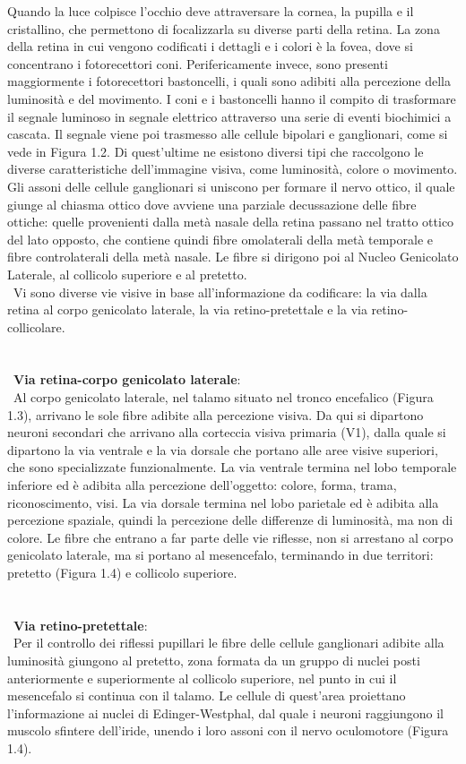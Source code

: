 Quando la luce colpisce l’occhio deve attraversare la cornea, la pupilla e il cristallino, che permettono di focalizzarla su diverse parti della retina. La zona della retina in cui vengono codificati i dettagli e i colori è la fovea, dove si concentrano i fotorecettori coni. Perifericamente invece, sono presenti maggiormente i fotorecettori bastoncelli, i quali sono adibiti alla percezione della luminosità e del movimento. I coni e i bastoncelli hanno il compito di trasformare il segnale luminoso in segnale elettrico attraverso una serie di eventi biochimici a cascata. Il segnale viene poi trasmesso alle cellule bipolari e ganglionari, come si vede in Figura 1.2. Di quest'ultime ne esistono diversi tipi che raccolgono le diverse caratteristiche dell’immagine visiva, come luminosità, colore o movimento. Gli assoni delle cellule ganglionari si uniscono per formare il nervo ottico, il quale giunge al chiasma ottico dove avviene una parziale decussazione delle fibre ottiche: quelle provenienti dalla metà nasale della retina passano nel tratto ottico del lato opposto, che contiene quindi fibre omolaterali della metà temporale e fibre controlaterali della metà nasale. Le fibre si dirigono poi al Nucleo Genicolato Laterale, al collicolo superiore e al pretetto\cite{bib17}. 
\\\
Vi sono diverse vie visive in base all’informazione da codificare: la via dalla retina al corpo genicolato laterale, la via retino-pretettale e la via retino-collicolare.
\\\ \\\ \\\ 
\textbf{Via retina-corpo genicolato laterale}: 
\\\
Al corpo genicolato laterale, nel talamo situato nel tronco encefalico (Figura 1.3), arrivano le sole fibre adibite alla percezione visiva. Da qui si dipartono neuroni secondari che arrivano alla corteccia visiva primaria (V1), dalla quale si dipartono la via ventrale e la via dorsale che portano alle aree visive superiori, che sono specializzate funzionalmente. La via ventrale termina nel lobo temporale inferiore ed è adibita alla percezione dell’oggetto: colore, forma, trama, riconoscimento, visi. La via dorsale termina nel lobo parietale ed è adibita alla percezione spaziale, quindi la percezione delle differenze di luminosità, ma non di colore.
Le fibre che entrano a far parte delle vie riflesse, non si arrestano al corpo genicolato laterale, ma si portano al mesencefalo, terminando in due territori: pretetto (Figura 1.4) e collicolo superiore.
\\\ \\\ \\\
\textbf{Via retino-pretettale}: 
\\\
Per il controllo dei riflessi pupillari le fibre delle cellule ganglionari adibite alla luminosità giungono al pretetto, zona formata da un gruppo di nuclei posti anteriormente e superiormente al collicolo superiore, nel punto in cui il mesencefalo si continua con il talamo. Le cellule di quest’area proiettano l’informazione ai nuclei di Edinger-Westphal, dal quale i neuroni raggiungono il muscolo sfintere dell’iride, unendo i loro assoni con il nervo oculomotore (Figura 1.4).

